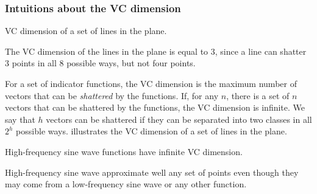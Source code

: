 \subsubsection{Intuitions about the VC dimension}
\label{sub:vc-dimension-intuition}

\begin{figurebox}[label=fig:vc-dimension]{VC dimension of a set of lines in the plane.}
  \centering
  \tcblower
  The VC dimension of the lines in the plane is equal to 3, since a line can shatter 3
  points in all 8 possible ways, but not four points.
\end{figurebox}

For a set of indicator functions, the VC dimension is the maximum number of vectors that
can be \emph{shattered} by the functions.  If, for any $n$, there is a set of $n$
vectors that can be shattered by the functions, the VC dimension is infinite.
We say that $h$ vectors can be shattered if they can be separated into two classes in all
$2^h$ possible ways.   illustrates the VC dimension of a set of
lines in the plane.

\begin{figurebox}[label=fig:vc-sin]{High-frequency sine wave functions have infinite VC dimension.}
  \centering
  \tcblower
  High-frequency sine wave approximate well any set of points even though they may come
  from a low-frequency sine wave or any other function.
\end{figurebox}

